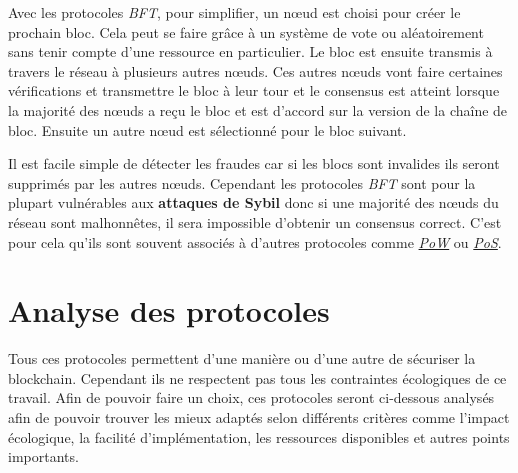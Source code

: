 Avec les protocoles \emph{BFT}, pour simplifier, un nœud est choisi pour créer le prochain bloc. Cela peut se faire grâce à un système de vote ou aléatoirement sans tenir compte d'une ressource en particulier. Le bloc est ensuite transmis à travers le réseau à plusieurs autres nœuds. Ces autres nœuds vont faire certaines vérifications et transmettre le bloc à leur tour et le consensus est atteint lorsque la majorité des nœuds a reçu le bloc et est d'accord sur la version de la chaîne de bloc. Ensuite un autre nœud est sélectionné pour le bloc suivant.

Il est facile simple de détecter les fraudes car si les blocs sont invalides ils seront supprimés par les autres nœuds. Cependant les protocoles \emph{BFT} sont pour la plupart vulnérables aux \textbf{attaques de Sybil} donc si une majorité des nœuds du réseau sont malhonnêtes, il sera impossible d'obtenir un consensus correct. C'est pour cela qu'ils sont souvent associés à d'autres protocoles comme \hyperref[consensus:pow]{\emph{PoW}} ou \hyperref[consensus:pos]{\textit{PoS}}.

\newpage

\section{Analyse des protocoles}

Tous ces protocoles permettent d'une manière ou d'une autre de sécuriser la blockchain. Cependant ils ne respectent pas tous les contraintes écologiques de ce travail. Afin de pouvoir faire un choix, ces protocoles seront ci-dessous analysés afin de pouvoir trouver les mieux adaptés selon différents critères comme l'impact écologique, la facilité d'implémentation, les ressources disponibles et autres points importants.

